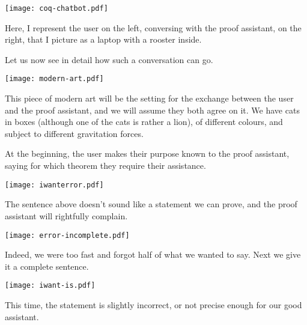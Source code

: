 %
\begin{center}
  \texttt{[image: coq-chatbot.pdf]}
\end{center}

Here, I represent the user on the left, conversing with the proof assistant, on
the right, that I picture as a laptop with a rooster inside.

Let us now see in detail how such a conversation can go.

\begin{center}
  \texttt{[image: modern-art.pdf]}
\end{center}

This piece of modern art will be the setting for the exchange between the user
and the proof assistant, and we will assume they both agree on it.
We have cats in boxes (although one of the cats is rather a lion), of different
colours, and subject to different gravitation forces.

At the beginning, the user makes their purpose known to the proof assistant,
saying for which theorem they require their assistance.

\begin{center}
  \texttt{[image: iwanterror.pdf]}
\end{center}

The sentence above doesn't sound like a statement we can prove, and the proof
assistant will rightfully complain.

\begin{center}
  \texttt{[image: error-incomplete.pdf]}
\end{center}

Indeed, we were too fast and forgot half of what we wanted to say. Next we give
it a complete sentence.

\begin{center}
  \texttt{[image: iwant-is.pdf]}
\end{center}

This time, the statement is slightly incorrect, or not precise enough for our
good assistant.

